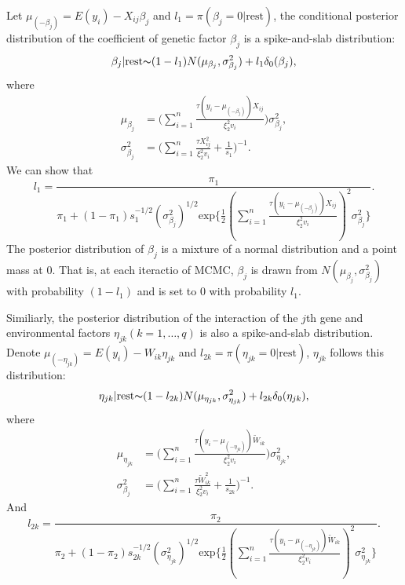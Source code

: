 \documentclass[12pt]{article}
\begin{document}
Let $\mu_{(-\beta_j)}=E(y_i)-X_{ij}\beta_j$ and $l_1 = \pi(\beta_j=0|\text{rest})$, the conditional posterior distribution of the coefficient of genetic factor $\beta_j$ is a spike-and-slab distribution:
\begin{equation}
\beta_j|\text{rest}{\thicksim} (1-l_1) N(\mu_{\beta_j}, \sigma_{\beta_j}^2)+l_1 \delta_0(\beta_j),
\end{equation}
where 
\begin{equation*}
\begin{aligned}
\mu_{\beta_j} &= \big(\sum_{i=1}^{n}\frac{\tau(y_i-\mu_{(-\beta_j)})X_{ij}}{\xi_2^2 v_i}\big)\sigma_{\beta_j}^2,\\
\sigma_{\beta_j}^{2} &= \big( \sum_{i=1}^{n} \frac{\tau X_{ij}^2}{\xi_2^2 v_i}+\frac{1}{s_1}\big)^{-1}.
\end{aligned}
\end{equation*}
We can show that
\begin{equation*}
l_1 = \frac{\pi_1}{\pi_1 + (1-\pi_1)s_1^{-1/2}({\sigma_{\beta_j}^{2}})^{1/2}\text{exp} \{ \frac{1}{2} (\sum_{i=1}^{n}\frac{\tau(y_i-\mu_{(-\beta_j)})X_{ij}}{\xi_2^2 v_i})^2\sigma_{\beta_j}^{2}\} }.
\end{equation*}
The posterior distribution of $\beta_j$ is a mixture of a normal distribution and a point mass at 0. That is, at each iteractio of MCMC, $\beta_j$ is drawn from $N(\mu_{\beta_j}, \sigma_{\beta_j}^2)$ with probability $(1-l_1)$ and is set to 0 with probability $l_1$. \par
Similiarly, the posterior distribution of the interaction of the $j$th gene and environmental factors $\eta_{jk} (k=1,\dots,q)$ is also a spike-and-slab distribution. Denote $\mu_{(-\eta_{jk})}=E(y_i)-W_{ik}\eta_{jk}$ and $l_{2k} = \pi(\eta_{jk}=0|\text{rest})$, $\eta_{jk}$ follows this distribution:
\begin{equation}
\eta_{jk}|\text{rest}{\thicksim} (1-l_{2k}) N(\mu_{\eta_{jk}}, \sigma_{\eta_{jk}}^2)+l_{2k} \delta_0(\eta_{jk}),
\end{equation}
where 
\begin{equation*}
\begin{aligned}
\mu_{\eta_{jk}} &= \big(\sum_{i=1}^{n}\frac{\tau(y_i-\mu_{(-\eta_{jk})})\tilde{W}_{ik}}{\xi_2^2 v_i}\big)\sigma_{\eta_{jk}}^2,\\
\sigma_{\beta_j}^{2} &= \big( \sum_{i=1}^{n} \frac{\tau \tilde{W}_{ik}^2}{\xi_2^2 v_i}+\frac{1}{s_{2k}}\big)^{-1}.
\end{aligned}
\end{equation*}
And 
\begin{equation}
l_{2k} = \frac{\pi_2}{\pi_2 + (1-\pi_2)s_{2k}^{-1/2}({\sigma_{\eta_{jk}}^{2}})^{1/2}\text{exp} \{ \frac{1}{2} (\sum_{i=1}^{n}\frac{\tau(y_i-\mu_{(-\eta_{jk})})\tilde{W}_{ik}}{\xi_2^2 v_i})^2\sigma_{\eta_{jk}}^{2}\} }.
\end{equation}
\end{document}
